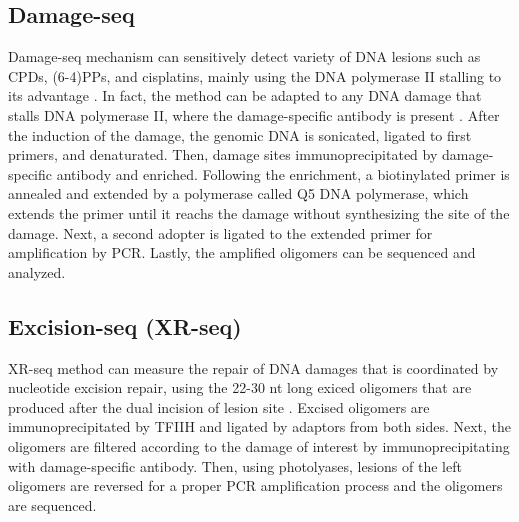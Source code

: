 \subsection{Damage-seq}

Damage-seq mechanism can sensitively detect variety of DNA lesions such as CPDs, (6-4)PPs, and  cisplatins, mainly using the DNA polymerase II stalling to its advantage \citep{hu2016cisplatin}. In fact, the method can be adapted to any DNA damage that stalls DNA polymerase II, where the damage-specific antibody is present \citep{sancar2016mechanisms}. After the induction of the damage, the genomic DNA is sonicated, ligated to first primers, and denaturated. Then, damage sites immunoprecipitated by damage-specific antibody and enriched. Following the enrichment, a biotinylated primer is annealed and extended by a polymerase called Q5 DNA polymerase, which extends the primer until it reachs the damage without synthesizing the site of the damage. Next, a second adopter is ligated to the extended primer for amplification by PCR. Lastly, the amplified oligomers can be sequenced and analyzed.      

\subsection{Excision-seq (XR-seq)}

XR-seq method can measure the repair of DNA damages that is coordinated by nucleotide excision repair, using the 22-30 nt long exiced oligomers that are produced after the dual incision of lesion site \citep{hu2019genome,hu2016cisplatin}. Excised oligomers are immunoprecipitated by TFIIH and ligated by adaptors from both sides. Next, the oligomers are filtered according to the damage of interest by immunoprecipitating with damage-specific antibody. Then, using photolyases, lesions of the left oligomers are reversed for a proper PCR amplification process and the oligomers are sequenced.